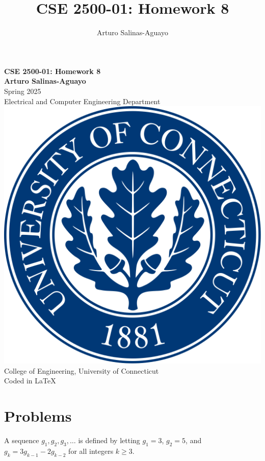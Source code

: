 \documentclass[12pt]{article}
\author{Arturo Salinas-Aguayo}
\title{CSE 2500-01: Homework 8}
\begin{document}
\newcommand{\closure}[2][3]{%
	{}\mkern#1mu\overline{\mkern-#1mu#2}}
\newcommand\ncoverline[1]{\mkern1mu\overline{\mkern-1mu#1\mkern-1mu}\mkern1mu}
\begin{titlepage}
	\centering
	\vspace*{3cm}
	\huge\textbf{CSE 2500-01: Homework 8}\\
	\vspace{5cm}
	\Large\textbf{Arturo Salinas-Aguayo}\\
	\normalsize
	Spring 2025\\
	Electrical and Computer Engineering Department\\
	\vfill
	\includegraphics[scale=0.1]{uconnlogo}\\
	College of Engineering, University of Connecticut\\
	\scriptsize{Coded in \LaTeX}
	\vspace*{1cm}
\end{titlepage}

\section*{Problems}

A sequence $g_1, g_2, g_3, \dots$ is defined by letting $g_1 = 3$, $g_2 = 5$, and $g_k = 3g_{k-1} - 2g_{k-2}$ for all integers $k \geq 3$.
\end{document}
